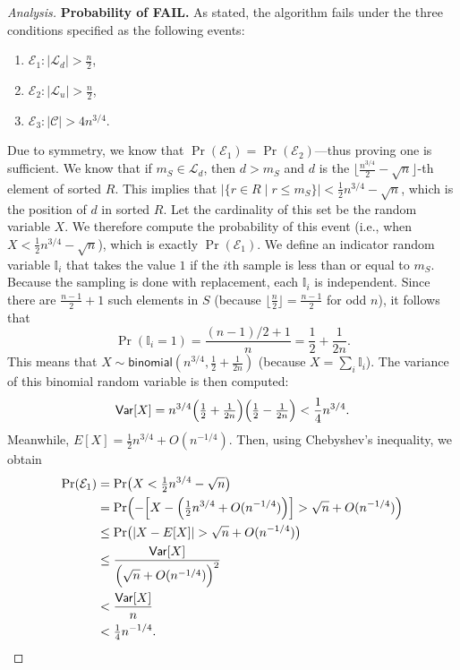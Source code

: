 \documentclass[12pt,a4paper]{article}
\newenvironment{analysis}[1][Analysis]%
{\begin{proof}[#1]}%
	{\end{proof}}
\begin{document}
\begin{analysis}
		\textbf{Probability of \textsc{FAIL}.} As stated, the algorithm fails under the three conditions specified as the following events:
		\begin{enumerate}
			\item \(\mathcal{E}_1: |\mathcal{L}_d| > \frac{n}{2}\),
			\item \(\mathcal{E}_2: |\mathcal{L}_u| > \frac{n}{2}\),
			\item \(\mathcal{E}_3: |\mathcal{C}| > 4n^{3/4}\).
		\end{enumerate}
		Due to symmetry, we know that \(\Pr(\mathcal{E}_1)=\Pr(\mathcal{E}_2)\)—thus proving one is sufficient. We know that if \(m_S \in \mathcal{L}_d\), then \(d > m_S\) and \(d\) is the \(\bigl\lfloor \tfrac{n^{3/4}}{2} - \sqrt{n}\bigr\rfloor\)-th element of sorted \(R\). This implies that \(|\{r \in R \mid r \le m_S\}| < \tfrac{1}{2}n^{3/4}-\sqrt{n}\), which is the position of \(d\) in sorted \(R\). Let the cardinality of this set be the random variable \(X\). We therefore compute the probability of this event (i.e., when \(X < \tfrac{1}{2}n^{3/4}-\sqrt{n}\)), which is exactly \(\Pr(\mathcal{E}_1)\). We define an indicator random variable \(\mathbb{I}_i\) that takes the value \(1\) if the \(i\)th sample is less than or equal to \(m_S\). Because the sampling is done with replacement, each \(\mathbb{I}_i\) is independent. Since there are \(\frac{n-1}{2}+1\) such elements in \(S\) (because \(\lfloor \tfrac{n}{2}\rfloor = \tfrac{n-1}{2}\) for odd \(n\)), it follows that
		\[
		\Pr(\mathbb{I}_i = 1) = \frac{(n-1)/2+1}{n} = \frac{1}{2} + \frac{1}{2n}.
		\]
		This means that \(X \sim \mathsf{binomial}(n^{3/4}, \tfrac{1}{2} + \tfrac{1}{2n})\) (because \(X = \sum_i \mathbb{I}_i\)). The variance of this binomial random variable is then computed:
		\[
		\mathsf{Var}[X] = n^{3/4}\Bigl(\tfrac{1}{2} + \tfrac{1}{2n}\Bigr)\Bigl(\tfrac{1}{2} - \tfrac{1}{2n}\Bigr) < \frac{1}{4} n^{3/4}.
		\]
		Meanwhile, \(E[X] = \tfrac{1}{2}n^{3/4} + O(n^{-1/4})\). Then, using Chebyshev's inequality, we obtain
		\begin{align*}
			\Pr(\mathcal{E}_1) &= \Pr\bigl(X < \tfrac{1}{2}n^{3/4}-\sqrt{n}\bigr)\\
			&= \Pr\Bigl(-\Bigl[X-\Bigl(\tfrac{1}{2}n^{3/4}+O(n^{-1/4})\Bigr)\Bigr] > \sqrt{n}+O(n^{-1/4})\Bigr)\\
			&\le \Pr\bigl(|X - E[X]| > \sqrt{n}+O(n^{-1/4})\bigr)\\
			&\le \frac{\mathsf{Var}[X]}{\Bigl(\sqrt{n}+O(n^{-1/4})\Bigr)^2}\\
			&< \frac{\mathsf{Var}[X]}{n}\\
			&< \tfrac{1}{4}n^{-1/4}.
		\end{align*}
		

\end{analysis}
\end{document}
